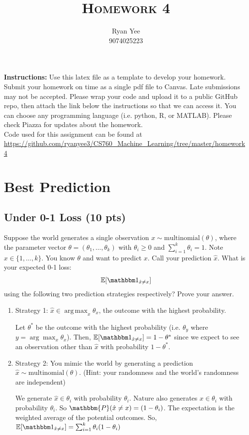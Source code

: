 \documentclass[a4paper]{article}
\title{\textsc{Homework 4}} %
\author{
Ryan Yee \\
9074025223\\
}
\date{}
\theoremstyle{definition}
\DeclareMathOperator*{\argmax}{arg\,max}
\def\E{\mathbb E}
\def\ind{\mathbbm 1}
\newenvironment{soln}{
    \leavevmode\color{blue}\ignorespaces
}{}
\begin{document}
\maketitle 


\textbf{Instructions:} Use this latex file as a template to develop your homework. Submit your homework on time as a single pdf file to Canvas. Late submissions may not be accepted. Please wrap your code and upload it to a public GitHub repo, then attach the link below the instructions so that we can access it. You can choose any programming language (i.e. python, R, or MATLAB). Please check Piazza for updates about the homework. \\

Code used for this assignment can be found at \url{https://github.com/ryanyee3/CS760_Machine_Learning/tree/master/homework4}

\section{Best Prediction}
\subsection{Under 0-1 Loss (10 pts)}
Suppose the world generates a single observation $x \sim \mbox{multinomial}(\theta)$, where the parameter vector $\theta=(\theta_1, \ldots, \theta_k)$ with $\theta_i\ge 0$ and $\sum_{i=1}^k \theta_i=1$.  Note $x \in \{1, \ldots, k\}$.
You know $\theta$ and want to predict $x$. 
Call your prediction $\hat x$.  What is your expected 0-1 loss: 
$$\E[\ind_{\hat x \neq x}]$$
using the following two prediction strategies respectively?  Prove your answer.
\begin{enumerate}
    \item Strategy 1: $\hat x \in \argmax_x \theta_x$, the outcome with the highest probability.
    
    \begin{soln}
        Let $\theta^{*}$ be the outcome with the highest probability (i.e. $\theta_{y}$ where $y = \arg \max_{x} \theta_{x}$). 
        Then, $\E[\ind_{\hat x \neq x}] = 1 - \theta^{*}$ since we expect to see an observation other than $\hat{x}$ with probability $1 - \theta^{*}$.
    \end{soln}

    \item Strategy 2: You mimic the world by generating a prediction $\hat x \sim \mbox{multinomial}(\theta)$.  (Hint: your randomness and the world's randomness are independent)
    
    \begin{soln}
        We generate $\hat x \in \theta_{i}$ with probability $\theta_{i}$.
        Nature also generates $x \in \theta_{i}$ with probability $\theta_{i}$.
        So $\mathbbm{P}(\hat x \neq x) = (1-\theta_{i})$.
        The expectation is the weighted average of the potential outcomes.
        So, $\E[\ind_{\hat x \neq x}] = \sum_{i = 1}^{k} \theta_{i} (1-\theta_{i})$
    \end{soln}

\end{enumerate}
\end{document}
